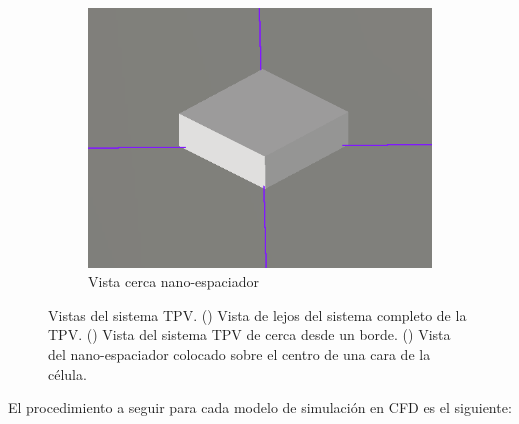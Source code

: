 \begin{figure}[H]
\begin{subfigure}[b]{0.3\textwidth}
			\includegraphics[width=1.00\textwidth]{figuras/Procedimiento_Simulaciones/Conduccion/modelado3D_centro_cerca.png}
		\caption{Vista cerca nano-espaciador}
		\label{fig:modelado3D_centro_cerca}
	\end{subfigure}
	\caption{Vistas del sistema TPV. () Vista de lejos del sistema completo de la TPV. () Vista del sistema TPV de cerca desde un borde. () Vista del nano-espaciador colocado sobre el centro de una cara de la célula.}
	\label{fig:modelado3D}
\end{figure}
El procedimiento a seguir para cada modelo de simulación en CFD es el siguiente:
